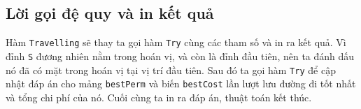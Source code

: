 \subsection{Lời gọi đệ quy và in kết quả}
Hàm \texttt{Travelling} sẽ thay ta gọi hàm \texttt{Try} cùng các tham số và in ra kết quả. Vì đỉnh \texttt{S} đương nhiên nằm trong hoán vị, và còn là đỉnh đầu tiên, nên ta đánh dấu nó đã có mặt trong hoán vị tại vị trí đầu tiên. Sau đó ta gọi hàm \texttt{Try} để cập nhật đáp án cho mảng \texttt{bestPerm} và biến \texttt{bestCost} lần lượt lưu đường đi tốt nhất và tổng chi phí của nó. Cuối cùng ta in ra đáp án, thuật toán kết thúc.